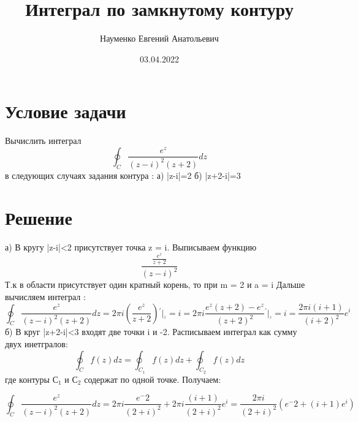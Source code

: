 \documentclass[12pt, letter paper]{article}
\title{Интеграл по замкнутому контуру}
\author{Науменко Евгений Анатольевич }
\date{03.04.2022}
\begin{document}
\maketitle

\section{Условие задачи}
Вычислить интеграл 
\[
    \oint_C \frac{e^z}{(z-i)^2(z+2)}dz
\]
в следующих случаях задания контура : а) |z-i|=2 б) |z+2-i|=3
\section{Решение}
а) В кругу |z-i|<2 присутствует точка z = i. Выписываем функцию
\[
    \frac{\frac{e^z}{z+2}}{(z-i)^2}
\]
Т.к в области присутствует один кратный корень, то при m = 2 и a = i
Дальше вычисляем интеграл : 
\[\oint_C \frac{e^z}{(z-i)^2(z+2)}dz = 2\pi i(\frac{e^z}{z+2}){^\prime\bigg|_^z=i} = 2\pi i\frac{e^z(z+2)-e^z}{(z+2)^2}{^\prime\bigg|_^z=i} =
\frac{2\pi i(i+1)}{(i+2)^2}e^i
\]
б) В круг {|z+2-i|<3} входят две точки i и -2. Расписываем интеграл как сумму двух инетгралов: 
\[
\oint_C f(z)dz = \oint_{C_1} f(z)dz+\oint_{C_2} f(z)dz
\]
где контуры С$_1$ и С$_2$ содержат по одной точке. Получаем:

\[\oint_C \frac{e^z}{(z-i)^2(z+2)}dz = 2\pi i\frac{e^-2}{(2+i)^2}+2\pi i\frac{(i+1)}{(2+i)^2}e^i = \frac{2\pi i}{(2+i)^2}(e^-2 +(i+1)e^i)
\]
\end{document}
